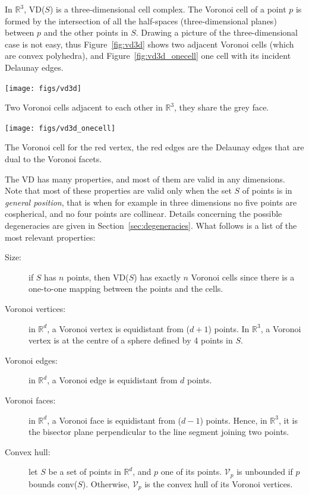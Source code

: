 %

In $\mathbb{R}^3$, VD($S$) is a three-dimensional cell complex. 
The Voronoi cell of a point $p$ is formed by the intersection of all the half-spaces (three-dimensional planes) between $p$ and the other points in $S$. 
Drawing a picture of the three-dimensional case is not easy, thus Figure~\ref{fig:vd3d} shows two adjacent Voronoi cells (which are convex polyhedra), and Figure~\ref{fig:vd3d_onecell} one cell with its incident Delaunay edges.
\begin{marginfigure}
  \centering
  \texttt{[image: figs/vd3d]}
  \caption[Two Voronoi cells adjacent to each other]{Two Voronoi cells adjacent to each other in $\mathbb{R}^3$, they share the grey face.}%
\label{fig:vd3d}
\end{marginfigure}
\begin{marginfigure}
  \centering
  \texttt{[image: figs/vd3d\_onecell]}
  \caption[The Voronoi cell for a vertex]{The Voronoi cell for the red vertex, the red edges are the Delaunay edges that are dual to the Voronoi facets.}%
\label{fig:vd3d_onecell}
\end{marginfigure}

%

The VD has many properties, and most of them are valid in any dimensions. 
Note that most of these properties are valid only when the set $S$ of points is in \emph{general position}, that is when for example in three dimensions no five points are cospherical, and no four points are collinear. 
Details concerning the possible degeneracies are given in Section~\ref{sec:degeneracies}. 
What follows is a list of the most relevant properties:
\begin{description}
  \item[Size:] if $S$ has $n$ points, then VD($S$) has exactly $n$ Voronoi cells since there is a one-to-one mapping between the points and the cells.
  \item[Voronoi vertices:] in $\mathbb{R}^d$, a Voronoi vertex is equidistant from ($d+1$) points. In $\mathbb{R}^3$, a Voronoi vertex is at the centre of a sphere defined by 4 points in $S$.
  \item[Voronoi edges:] in $\mathbb{R}^d$, a Voronoi edge is equidistant from $d$ points.
  \item[Voronoi faces:] in $\mathbb{R}^d$, a Voronoi face is equidistant from ($d-1$) points. Hence, in $\mathbb{R}^3$, it is the bisector plane perpendicular to the line segment joining two points.
  \item[Convex hull:] let $S$ be a set of points in $\mathbb{R}^d$, and $p$ one of its points. $\mathcal{V}_{p}$ is unbounded if $p$ bounds conv($S$). Otherwise, $\mathcal{V}_{p}$ is the convex hull of its Voronoi vertices. 
\end{description}


